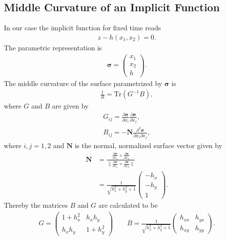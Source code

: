 \subsection{Middle Curvature of an Implicit Function}
In our case the implicit function for fixed time reads
\begin{align}
    z-h\left(x_1,x_2\right) = 0.
\end{align}
The parametric representation is
\begin{align}
    \mathbf{\sigma} = \begin{pmatrix} x_1 \\ x_2 \\ h \end{pmatrix} .
\end{align}
The middle curvature of the surface parametrized by $\mathbf{\sigma}$ is
\begin{align}
    \frac{1}{R} = \text{Tr}(G^{-1}B),
\end{align}
where $G$ and $B$ are given by
\begin{align}
    G_{ij} = \frac{\partial \mathbf{\sigma}}{\partial x_i} \frac{\partial
    \mathbf{\sigma}}{\partial x_j}, \\
    B_{ij} = -\mathbf{N} \frac{\partial^2 \mathbf{\sigma}}{\partial
    x_i\partial x_j},
\end{align}
where $i, j = 1, 2$ and $\mathbf{N}$ is the normal, normalized surface vector given by
\begin{align}
    \mathbf{N} &= \frac{\frac{\partial \mathbf{\sigma}}{\partial x_1}\times
    \frac{\partial \mathbf{\sigma}}{\partial x_2}}{\|\frac{\partial \mathbf{\sigma}}{\partial x_1}\times
    \frac{\partial \mathbf{\sigma}}{\partial x_2}\|} \\
               &= \frac{1}{\sqrt{h_x^2 + h_y^2 +1}} \begin{pmatrix}
               -h_x\\-h_y\\1 \end{pmatrix}.
\end{align}
Thereby the matrices $B$ and $G$ are calculated to be
\begin{align}
    G = \begin{pmatrix} 1+h_x^2 & h_xh_y\\h_xh_y & 1+h_y^2 \end{pmatrix}
    \qquad
    B =\frac{1}{\sqrt{h_x^2 +h_y^2 +1} } \begin{pmatrix}h_{x x} &
    h_{yx}\\h_{x y} & h_{yy}  \end{pmatrix}.
\end{align}
